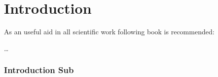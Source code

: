 \chapter{Introduction}
\label{sec:Introduction}

As an useful aid in all scientific work following book is recommended: \cite{deininger1992studienarbeiten}

\dots
{}
\Blindtext

\subsection{Introduction Sub}
\Blindtext
\Blindtext